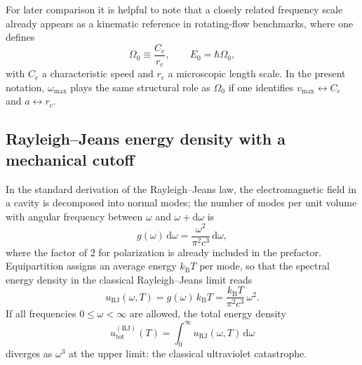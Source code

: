 \documentclass[11pt]{article}
\begin{document}
            For later comparison it is helpful to note that a closely related frequency scale already
            appears as a kinematic reference in rotating-flow benchmarks, where one defines
            \begin{equation}
                \Omega_0 \equiv \frac{C_e}{r_c}, \qquad
                E_0 = \hbar \Omega_0,
                \label{eq:Omega0-def}
            \end{equation}
            with $C_e$ a characteristic speed and $r_c$ a microscopic length scale.
            In the present notation, $\omega_{\max}$ plays the same structural role as $\Omega_0$
            if one identifies $v_{\max}\leftrightarrow C_e$ and $a\leftrightarrow r_c$.

        \subsection{Rayleigh--Jeans energy density with a mechanical cutoff}

            In the standard derivation of the Rayleigh--Jeans law, the electromagnetic field in a
            cavity is decomposed into normal modes; the number of modes per unit volume with angular
            frequency between $\omega$ and $\omega+\mathrm{d}\omega$ is
            \begin{equation}
                g(\omega)\,\mathrm{d}\omega
                = \frac{\omega^2}{\pi^2 c^3}\,\mathrm{d}\omega,
            \end{equation}
            where the factor of $2$ for polarization is already included in the prefactor.
            Equipartition assigns an average energy $k_{\mathrm B}T$ per mode, so that the spectral
            energy density in the classical Rayleigh--Jeans limit reads
            \begin{equation}
                u_{\mathrm{RJ}}(\omega,T)
                = g(\omega)\,k_{\mathrm B}T
                = \frac{k_{\mathrm B}T}{\pi^2 c^3}\,\omega^2.
                \label{eq:u-RJ-again}
            \end{equation}
            If all frequencies $0\le\omega<\infty$ are allowed, the total energy density
            \begin{equation}
                u_{\mathrm{tot}}^{(\mathrm{RJ})}(T)
                = \int_0^\infty u_{\mathrm{RJ}}(\omega,T)\,\mathrm{d}\omega
            \end{equation}
            diverges as $\omega^3$ at the upper limit: the classical ultraviolet catastrophe.
\end{document}
